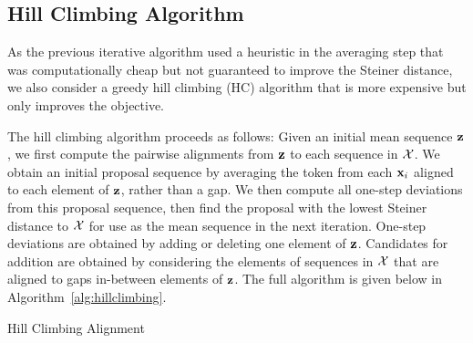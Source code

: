 \documentclass{article}
\begin{document}
\subsection{Hill Climbing Algorithm}
As the previous iterative algorithm used a heuristic in the averaging step
that was computationally cheap but not guaranteed to improve the Steiner distance,
we also consider a greedy hill climbing (HC) algorithm that is more expensive but
only improves the objective.

The hill climbing algorithm proceeds as follows: Given an initial mean sequence $\bz$,
we first compute the pairwise alignments from $\bz$ to each sequence in $\mathcal{X}$.
We obtain an initial proposal sequence by averaging the token from each $\mathbf{x}_i$ aligned
to each element of $\bz$, rather than a gap.
We then compute all one-step deviations from this proposal sequence,
then find the proposal with the lowest Steiner distance to $\mathcal{X}$ for use as 
the mean sequence in the next iteration.
One-step deviations are obtained by adding or deleting one element of $\bz$.
Candidates for addition are obtained by considering the elements of sequences in $\mathcal{X}$
that are aligned to gaps in-between elements of $\bz$.
The full algorithm is given below in Algorithm~\ref{alg:hillclimbing}.

\begin{algorithm}[h]
\begin{algorithmic}
    \EndFor
        \EndFor
        \EndFor
    \EndFor
    \Return{$\bz$}
    \EndIf
\EndFor
\Return{$\bz$}
\EndFunction
{}
\EndFor
\Return{$\bz$}
\EndFunction
\end{algorithmic}
\caption{\label{alg:hillclimbing}
Hill Climbing Alignment
}
\end{algorithm}
\end{document}
